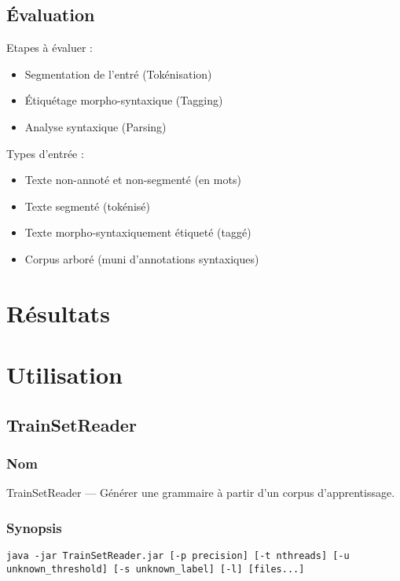 \documentclass[12pt]{article}
\begin{document}
\subsection{\'Evaluation}

Etapes \`a \'evaluer :
\begin{itemize}
\item Segmentation de l'entr\'e (Tok\'enisation)
\item \'Etiqu\'etage morpho-syntaxique (Tagging)
\item Analyse syntaxique (Parsing)
\end{itemize}

Types d'entr\'ee :
\begin{itemize}
\item Texte non-annot\'e et non-segment\'e (en mots)
\item Texte segment\'e (tok\'enis\'e)
\item Texte morpho-syntaxiquement \'etiquet\'e (tagg\'e)
\item Corpus arbor\'e (muni d'annotations syntaxiques)
\end{itemize}


\section{R\'esultats}

\section{Utilisation}
\subsection{TrainSetReader}
\subsubsection{Nom}
 
TrainSetReader --- Générer une grammaire à partir d'un corpus d'apprentissage.
 
\subsubsection{Synopsis}
 
{\ttfamily
\begin{verbatim}
java -jar TrainSetReader.jar [-p precision] [-t nthreads] [-u
unknown_threshold] [-s unknown_label] [-l] [files...]
\end{verbatim}
}
 
\end{document}
